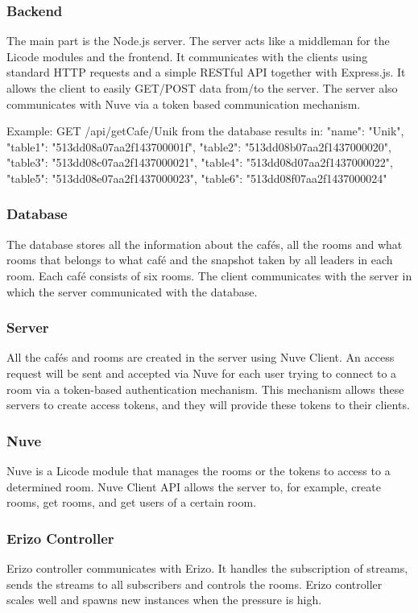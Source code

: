 \documentclass[12pt, titlepage]{article}
\begin{document}
\subsubsection{Backend}
The main part is the Node.js server. The server acts like a middleman for the Licode modules and the frontend. It communicates with the clients using standard HTTP requests and a simple RESTful API together with Express.js. It allows the client to easily GET/POST data from/to the server. The server also communicates with Nuve via a token based communication mechanism.

Example: GET /api/getCafe/Unik from the database results in:
"name": "Unik",
"table1": "513dd08a07aa2f143700001f",
"table2": "513dd08b07aa2f1437000020",
"table3": "513dd08c07aa2f1437000021",
"table4": "513dd08d07aa2f1437000022",
"table5": "513dd08e07aa2f1437000023",
"table6": "513dd08f07aa2f1437000024"
\subsubsection{Database}
The database stores all the information about the cafés, all the rooms and what rooms that belongs to what café and the snapshot taken by all leaders in each room. Each café consists of six rooms. The client communicates with the server in which the server communicated with the database.
\subsubsection{Server}
All the cafés and rooms are created in the server using Nuve Client. An access request will be sent and accepted via Nuve for each user trying to connect to a room via a token-based authentication mechanism. This mechanism allows these servers to create access tokens, and they will provide these tokens to their clients. 
\subsubsection{Nuve}
Nuve is a Licode module that manages the rooms or the tokens to access to a determined room. Nuve Client API allows the server to, for example, create rooms, get rooms, and get users of a certain room.
\subsubsection{Erizo Controller}
Erizo controller communicates with Erizo. It handles the subscription of streams, sends the streams to all subscribers and controls the rooms. Erizo controller scales well and spawns new instances when the pressure is high.
\end{document}

